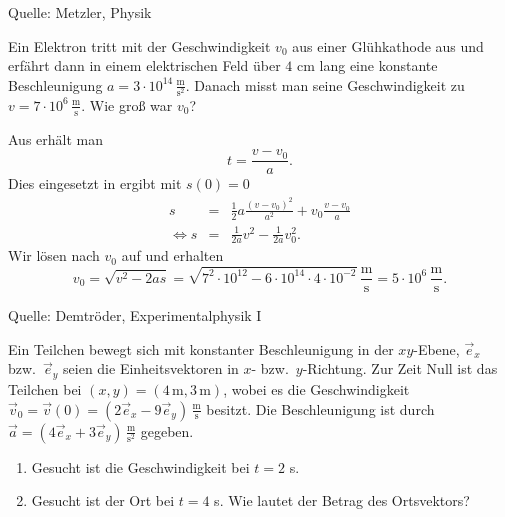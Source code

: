\begin{MExercises}
\begin{MExercise}
\begin{MSolution}
     \end{MSolution}
     
     Quelle: Metzler, Physik
     \end{MExercise}
     
     \begin{MExercise}
     Ein Elektron tritt mit der Geschwindigkeit $v_0$ aus einer Gl\"uhkathode aus und erf\"ahrt dann in einem elektrischen Feld \"uber $4$ cm lang eine konstante Beschleunigung $a=3\cdot 10^{14}\,\frac{\text{m}}{\text{s}^2}$. Danach misst man seine Geschwindigkeit zu $v=7\cdot 10^6 \,\frac{\text{m}}{\text{s}}$. Wie gro{\ss} war $v_0$?
     
     \begin{MSolution} Aus  erh\"alt man 
     \begin{equation*}
     t=\frac{v-v_0}{a}.
     \end{equation*}
     Dies eingesetzt in  ergibt mit $s(0)=0$
     \begin{eqnarray*}
     s&=&\frac{1}{2}a\frac{(v-v_0)^2}{a^2}+v_0\frac{v-v_0}{a}\\
     \Leftrightarrow s&=&\frac{1}{2a}v^2-\frac{1}{2a}v_0^2.
     \end{eqnarray*}
     Wir l\"osen nach $v_0$ auf und erhalten 
     \begin{equation*}
     v_0=\sqrt{v^2-2as}=\sqrt{7^2\cdot 10^{12}-6\cdot 10^{14}\cdot4\cdot10^{-2}}\,\frac{\text{m}}{\text{s}}=5\cdot 10^{6}\,\frac{\text{m}}{\text{s}}.
     \end{equation*}
     
     \end{MSolution}
     
     Quelle: Demtr\"oder, Experimentalphysik I
     \end{MExercise}
     

     \begin{MExercise}
     Ein Teilchen bewegt sich mit konstanter Beschleunigung in der $xy$-Ebene, $\vec{e}_x$ bzw.~$\vec{e}_y$ seien die Einheitsvektoren in $x$- bzw.~$y$-Richtung. Zur Zeit Null ist das Teilchen bei $(x,y)=(4\,\text{m},3\,\text{m})$, wobei es die Geschwindigkeit $\vec{v}_0=\vec{v}(0)=(2\vec{e}_x-9\vec{e}_y)\,\frac{\text{m}}{\text{s}}$ besitzt. Die Beschleunigung ist durch $\vec{a}=(4\vec{e}_x+3\vec{e}_y)\,\frac{\text{m}}{\text{s}^2}$ gegeben.
     \begin{enumerate}
     \item Gesucht ist die Geschwindigkeit bei $t=2$ s.
     \item Gesucht ist der Ort bei $t=4$ s. Wie lautet der Betrag des Ortsvektors?
     \end{enumerate}
     

\end{MExercise}
\end{MExercises}
